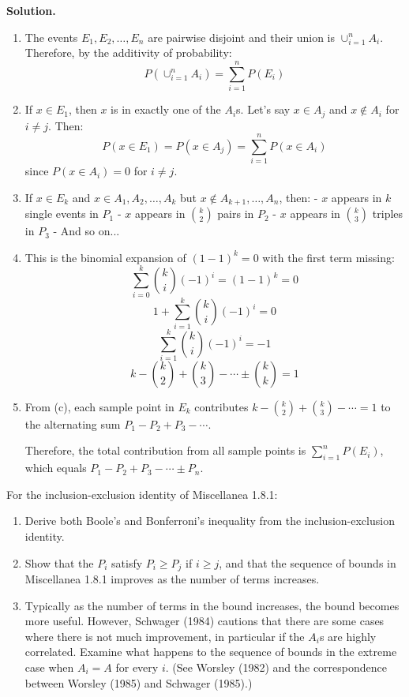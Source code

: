 \noindent\textbf{Solution.}
\begin{enumerate}[label=(\alph*)]
    \item The events $E_1, E_2, \ldots, E_n$ are pairwise disjoint and their union is $\cup_{i=1}^{n} A_i$. Therefore, by the additivity of probability:
    \[ P(\cup_{i=1}^{n} A_i) = \sum_{i=1}^{n} P(E_i) \]
    
    \item If $x \in E_1$, then $x$ is in exactly one of the $A_i$s. Let's say $x \in A_j$ and $x \notin A_i$ for $i \neq j$. Then:
    \[ P(x \in E_1) = P(x \in A_j) = \sum_{i=1}^{n} P(x \in A_i) \]
    since $P(x \in A_i) = 0$ for $i \neq j$.
    
    \item If $x \in E_k$ and $x \in A_1, A_2, \ldots, A_k$ but $x \notin A_{k+1}, \ldots, A_n$, then:
    - $x$ appears in $k$ single events in $P_1$
    - $x$ appears in $\binom{k}{2}$ pairs in $P_2$
    - $x$ appears in $\binom{k}{3}$ triples in $P_3$
    - And so on...
    
    \item This is the binomial expansion of $(1 - 1)^k = 0$ with the first term missing:
    \[ \sum_{i=0}^{k} \binom{k}{i} (-1)^i = (1 - 1)^k = 0 \]
    \[ 1 + \sum_{i=1}^{k} \binom{k}{i} (-1)^i = 0 \]
    \[ \sum_{i=1}^{k} \binom{k}{i} (-1)^i = -1 \]
    \[ k - \binom{k}{2} + \binom{k}{3} - \cdots \pm \binom{k}{k} = 1 \]
    
    \item From (c), each sample point in $E_k$ contributes $k - \binom{k}{2} + \binom{k}{3} - \cdots = 1$ to the alternating sum $P_1 - P_2 + P_3 - \cdots$.
    
    Therefore, the total contribution from all sample points is $\sum_{i=1}^{n} P(E_i)$, which equals $P_1 - P_2 + P_3 - \cdots \pm P_n$.
\end{enumerate}


\begin{problembox}
For the inclusion-exclusion identity of Miscellanea 1.8.1:
\begin{enumerate}[label=(\alph*)]
    \item Derive both Boole's and Bonferroni's inequality from the inclusion-exclusion identity.
    \item Show that the $P_{i}$ satisfy $P_{i}\geq P_{j}$ if $i\geq j$, and that the sequence of bounds in Miscellanea 1.8.1 improves as the number of terms increases.
    \item Typically as the number of terms in the bound increases, the bound becomes more useful. However, Schwager (1984) cautions that there are some cases where there is not much improvement, in particular if the $A_{i}$s are highly correlated. Examine what happens to the sequence of bounds in the extreme case when $A_{i}=A$ for every $i$. (See Worsley (1982) and the correspondence between Worsley (1985) and Schwager (1985).)
\end{enumerate}
\end{problembox}

